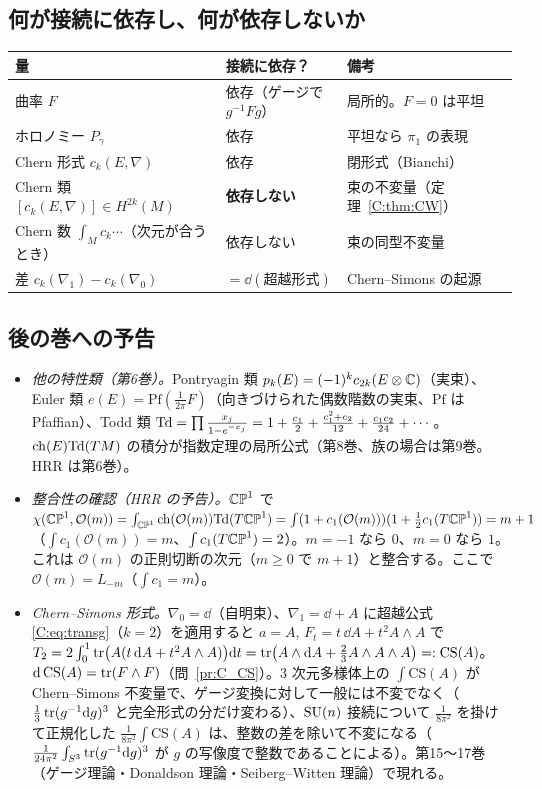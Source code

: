 \subsection{何が接続に依存し、何が依存しないか}
\begin{center}
\begin{tabular}{lll}
\toprule
量 & 接続に依存？ & 備考\\
\midrule
曲率 $F$ & 依存（ゲージで $g^{-1}Fg$） & 局所的。$F=0$ は平坦\\
ホロノミー $P_\gamma$ & 依存 & 平坦なら $\pi_1$ の表現\\
Chern 形式 $c_k(E,\nabla)$ & 依存 & 閉形式（Bianchi）\\
Chern 類 $[c_k(E,\nabla)]\in H^{2k}(M)$ & \textbf{依存しない} & 束の不変量（定理~\ref{C:thm:CW}）\\
Chern 数 $\int_Mc_{k}\cdots$（次元が合うとき） & 依存しない & 束の同型不変量\\
差 $c_k(\nabla_1)-c_k(\nabla_0)$ & $=\dd(\text{超越形式})$ & Chern--Simons の起源\\
\bottomrule
\end{tabular}
\end{center}

\subsection{後の巻への予告}
\begin{itemize}
\item \emph{他の特性類（第6巻）。}Pontryagin 類 $p_k(E)=(-1)^kc_{2k}(E\otimes\mathbb C)$（実束）、Euler 類 $e(E)=\mathrm{Pf}(\frac1{2\pi}F)$（向きづけられた偶数階数の実束、$\mathrm{Pf}$ は Pfaffian）、Todd 類 $\mathrm{Td}=\prod\frac{x_j}{1-e^{-x_j}}=1+\frac{c_1}2+\frac{c_1^2+c_2}{12}+\frac{c_1c_2}{24}+\cdots$。$\mathrm{ch}(E)\mathrm{Td}(TM)$ の積分が指数定理の局所公式（第8巻、族の場合は第9巻。HRR は第6巻）。\tC
\item \emph{整合性の確認（HRR の予告）。}$\mathbb{CP}^1$ で $\chi(\mathbb{CP}^1,\mathcal O(m))=\int_{\mathbb{CP}^1}\mathrm{ch}(\mathcal O(m))\mathrm{Td}(T\mathbb{CP}^1)=\int(1+c_1(\mathcal O(m)))(1+\tfrac12c_1(T\mathbb{CP}^1))=m+1$（$\int c_1(\mathcal O(m))=m$、$\int c_1(T\mathbb{CP}^1)=2$）。$m=-1$ なら $0$、$m=0$ なら $1$。これは $\mathcal O(m)$ の正則切断の次元（$m\ge0$ で $m+1$）と整合する。ここで $\mathcal O(m)=L_{-m}$（$\int c_1=m$）。
\item \emph{Chern--Simons 形式。}$\nabla_0=\dd$（自明束）、$\nabla_1=\dd+A$ に超越公式 \eqref{C:eq:transg}（$k=2$）を適用すると $a=A$, $F_t=t\,\dd A+t^2A\wedge A$ で $T_2=2\int_0^1\operatorname{tr}\bigl(A(t\,\mathrm{d} A+t^2A\wedge A)\bigr)\mathrm{d} t=\operatorname{tr}\bigl(A\wedge\mathrm{d} A+\tfrac23A\wedge A\wedge A\bigr)=:\mathrm{CS}(A)$。$\mathrm{d}\,\mathrm{CS}(A)=\operatorname{tr}(F\wedge F)$（問~\ref{pr:C_CS}）。3 次元多様体上の $\int\mathrm{CS}(A)$ が Chern--Simons 不変量で、ゲージ変換に対して一般には不変でなく（$\tfrac13\operatorname{tr}(g^{-1}\mathrm{d} g)^3$ と完全形式の分だけ変わる）、$\mathrm{SU}(n)$ 接続について $\frac1{8\pi^2}$ を掛けて正規化した $\frac1{8\pi^2}\int\mathrm{CS}(A)$ は、整数の差を除いて不変になる（$\frac1{24\pi^2}\int_{S^3}\operatorname{tr}(g^{-1}\mathrm{d} g)^3$ が $g$ の写像度で整数であることによる）\tC。第15〜17巻（ゲージ理論・Donaldson 理論・Seiberg--Witten 理論）で現れる。
\end{itemize}

